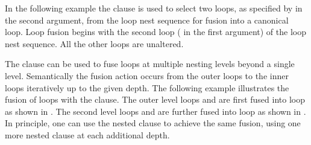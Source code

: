 
In the following example the  clause is used to select two
loops,
as specified by  in the second argument,
from the loop nest sequence for fusion into a canonical loop. 
Loop fusion begins with the second loop ( in the first argument)
of the loop nest sequence. All the other loops are unaltered.

\clearpage

The  clause can be used to fuse loops at multiple nesting levels
beyond a single level. Semantically the fusion action occurs from the outer
loops to the inner loops iteratively up to the given depth.
The following example illustrates the fusion of loops with
the  clause.
The outer level loops  and  are first fused into loop
 as shown in .
The second level loops  and  are further fused into
loop  as shown in .
In principle, one can use the nested  clause to achieve
the same fusion, using one more nested  clause at each
additional depth.

